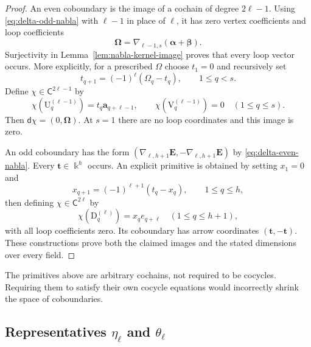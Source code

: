\documentclass[a4paper,11pt,oneside,reqno]{amsart}
\theoremstyle{definition}
\numberwithin{equation}{section}
\begin{document}
	\begin{proof}
		An even coboundary is the image of a cochain of degree $2\ell-1$.
		Using \eqref{eq:delta-odd-nabla} with $\ell-1$ in place of $\ell$, it
		has zero vertex coefficients and loop coefficients
		\[
		\boldsymbol\Omega
		=\nabla_{\ell-1,s}(\boldsymbol\alpha+\boldsymbol\beta).
		\]
		Surjectivity in Lemma~\ref{lem:nabla-kernel-image} proves that every loop
		vector occurs.  More explicitly, for a prescribed $\Omega$ choose
		$t_1=0$ and recursively set
		\begin{equation}\label{eq:even-primitive-recursion}
			t_{q+1}=(-1)^\ell(\Omega_q-t_q),\qquad1\leq q<s.
		\end{equation}
		Define $\chi\in \mathsf C^{2\ell-1}$ by
		\begin{equation}\label{eq:even-primitive}
			\chi(\mathrm{U}_q^{(\ell-1)})=t_q \mathbf{a}_{q+\ell-1},\qquad
			\chi(\mathrm{V}_q^{(\ell-1)})=0\quad(1\leq q\leq s).
		\end{equation}
		Then $\mathsf d\chi=(0,\boldsymbol\Omega)$.
		At $s=1$ there are no loop coordinates and this image is zero.
		
		An odd coboundary has the form
		$(\nabla_{\ell,h+1}\mathbf E,-\nabla_{\ell,h+1}\mathbf E)$ by
		\eqref{eq:delta-even-nabla}.  Every $\mathbf t\in \Bbbk^h$ occurs.
		An explicit primitive is obtained by setting $x_1=0$ and
		\begin{equation}\label{eq:odd-primitive-recursion}
			x_{q+1}=(-1)^{\ell+1}(t_q-x_q),\qquad1\leq q\leq h,
		\end{equation}
		then defining $\chi\in \mathsf C^{2\ell}$ by
		\begin{equation}\label{eq:odd-primitive}
			\chi(\mathrm{D}_q^{(\ell)})=x_q e_{q+\ell}
			\quad(1\leq q\leq h+1),
		\end{equation}
		with all loop coefficients zero.  Its coboundary has arrow coordinates
		$(\mathbf t,-\mathbf t)$.  These constructions prove both the claimed
		images and the stated dimensions over every field.
	\end{proof}
	
	The primitives above are arbitrary cochains, not required to be
	cocycles.  Requiring them to satisfy their own cocycle equations would
	incorrectly shrink the space of coboundaries.
	
	\subsection{Representatives \texorpdfstring{$\eta_\ell$ and $\theta_\ell$}{eta and theta}}
	
\end{document}
